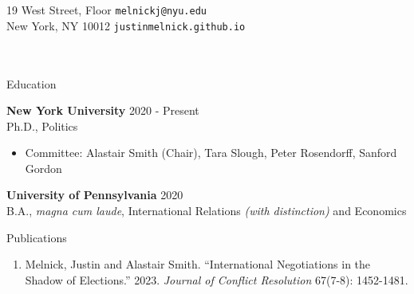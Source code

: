 \documentclass{resume} %
\begin{document}
19 West  Street,  Floor \hfill \texttt{melnickj@nyu.edu}\\
New York, NY 10012 \hfill \texttt{justinmelnick.github.io}\\\\\\
\begin{rSection}{Education}

{\bf New York University} \hfill { 2020 - Present} \\
Ph.D., Politics 
\begin{itemize}
    \item Committee: Alastair Smith (Chair), Tara Slough, Peter Rosendorff, Sanford Gordon
\end{itemize}
\vspace*{0.075in}

{\bf University of Pennsylvania} \hfill { 2020} 
\\B.A., \emph{magna cum laude}, International Relations \emph{(with distinction)} and Economics


\end{rSection}

\begin{rSection}{Publications}

\begin{enumerate}
    \item Melnick, Justin and Alastair Smith. ``International Negotiations in the Shadow of Elections.'' 2023. \textit{Journal of Conflict Resolution} 67(7-8): 1452-1481.
\end{enumerate}

\end{rSection}
\end{document}
